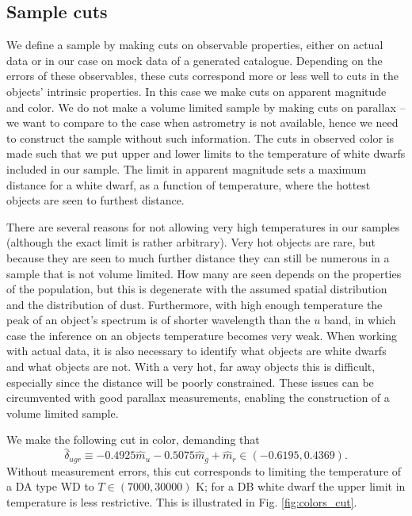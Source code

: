 \documentclass[fleqn,usenatbib]{mnras}
\newcommand{\Teff}{T}
\begin{document}
\subsection{Sample cuts}\label{sec:sample_cuts}

We define a sample by making cuts on observable properties, either on actual data or in our case on mock data of a generated catalogue. Depending on the errors of these observables, these cuts correspond more or less well to cuts in the objects' intrinsic properties. In this case we make cuts on apparent magnitude and color. We do not make a volume limited sample by making cuts on parallax -- we want to compare to the case when astrometry is not available, hence we need to construct the sample without such information. The cuts in observed color is made such that we put upper and lower limits to the temperature of white dwarfs included in our sample. The limit in apparent magnitude sets a maximum distance for a white dwarf, as a function of temperature, where the hottest objects are seen to furthest distance.

There are several reasons for not allowing very high temperatures in our samples (although the exact limit is rather arbitrary). Very hot objects are rare, but because they are seen to much further distance they can still be numerous in a sample that is not volume limited. How many are seen depends on the properties of the population, but this is degenerate with the assumed spatial distribution and the distribution of dust. Furthermore, with high enough temperature the peak of an object's spectrum is of shorter wavelength than the $u$ band, in which case the inference on an objects temperature becomes very weak. When working with actual data, it is also necessary to identify what objects are white dwarfs and what objects are not. With a very hot, far away objects this is difficult, especially since the distance will be poorly constrained. These issues can be circumvented with good parallax measurements, enabling the construction of a volume limited sample.

We make the following cut in color, demanding that
\begin{equation}
	\hat{\delta}_{ugr} \equiv -0.4925\hat{m}_u-0.5075\hat{m}_g+\hat{m}_r \in (-0.6195,0.4369).
\end{equation}
Without measurement errors, this cut corresponds to limiting the temperature of a DA type WD to $\Teff \in (7000,30000)$ K; for a DB white dwarf the upper limit in temperature is less restrictive. This is illustrated in Fig. \ref{fig:colors_cut}.
\end{document}
